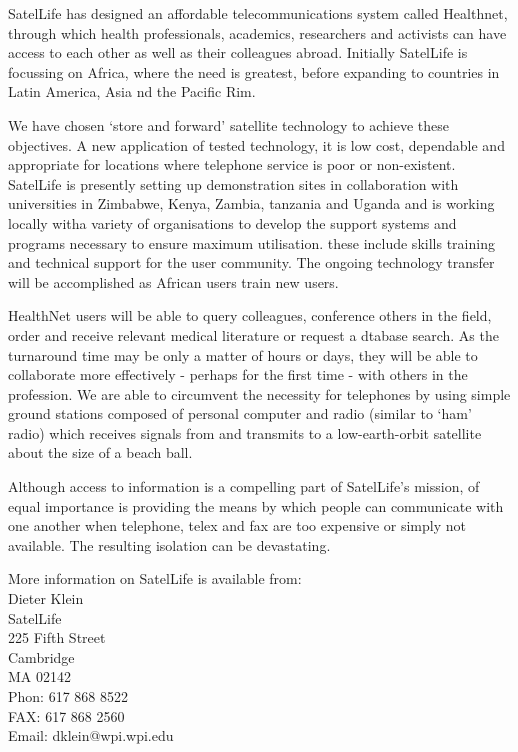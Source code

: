 SatelLife has designed an affordable telecommunications system called
Healthnet, through which health professionals, academics, researchers
and activists can have access to each other as well as their
colleagues abroad. Initially SatelLife is focussing on Africa, where
the need is greatest, before expanding to countries in Latin America,
Asia nd the Pacific Rim.

We have chosen `store and forward' satellite technology to achieve
these objectives. A new application of tested technology, it is low
cost, dependable and appropriate for locations where telephone service
is poor or non-existent. SatelLife is presently setting up
demonstration sites in collaboration with universities in Zimbabwe,
Kenya, Zambia, tanzania and Uganda and is working locally witha
variety of organisations to develop the support systems and programs
necessary to ensure maximum utilisation. these include skills training
and technical support for the user community. The ongoing technology
transfer will be accomplished as African users train new users.

HealthNet users will be able to query colleagues, conference others in
the field, order and receive relevant medical literature or request a
dtabase search. As the turnaround time may be only a matter of hours
or days, they will be able to collaborate more effectively - perhaps
for the first time - with others in the profession. We are able to
circumvent the necessity for telephones by using simple ground
stations composed of personal computer and radio (similar to `ham'
radio) which receives signals from and transmits to a low-earth-orbit
satellite about the size of a beach ball.

Although access to information is a compelling part of SatelLife's
mission, of equal importance is providing the means by which people
can communicate with one another when telephone, telex and fax are too
expensive or simply not available. The resulting isolation can be
devastating. 

More information on SatelLife is available from:\\
 Dieter Klein\\
 SatelLife\\
 225 Fifth Street\\
     Cambridge\\
     MA 02142\\
Phon: 617 868 8522\\
FAX: 617 868 2560\\
Email: dklein@wpi.wpi.edu

